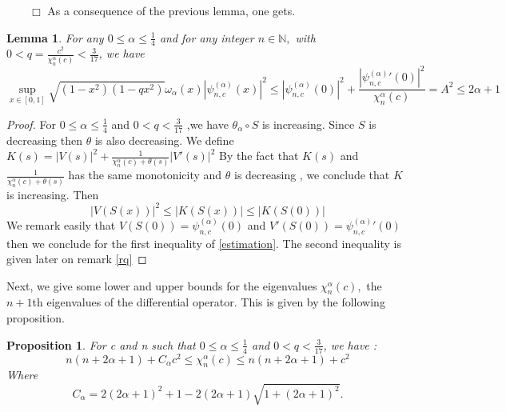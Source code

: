\documentclass[]{article}
\newtheorem{lemma}{Lemma}
\newtheorem{proposition}{Proposition}
\newcommand\ds{\displaystyle}
\newcounter{rea}
\begin{document}
$\qquad \Box $
As a consequence of the previous lemma, one gets.
\begin{lemma}
	For any $0\leq  \alpha\leq \frac{1}{4}$ and for any integer $n\in \mathbb N,$ with  $0<q=\frac{c^2}{\chi_n^\alpha(c)} <\frac{3}{17}$, we have
	\begin{equation}\label{estimation}
	 \ds{\sup_{x\in[0,1]}}\sqrt{(1-x^2)(1-qx^2)}\omega_{\alpha}(x)|\psi_{n,c}^{(\alpha)}(x)|^2\leq|\psi_{n,c}^{(\alpha)}(0)|^2+
	\frac{|{\psi_{n,c}^{(\alpha)}}'(0)|^2}{\chi_n^{\alpha}(c)}= A^2 \leq 2 \alpha + 1 \;
	\end{equation}
	
\end{lemma}


\begin{proof}
	For $0\leq  \alpha\leq \frac{1}{4}$ and $0<q<\frac{3}{17}$ ,we have $ \theta_{\alpha} \circ S $ is increasing. Since $S$ is decreasing then $ \theta $ is also decreasing. We define $K(s)= |V(s)|^2 + \frac{1}{\chi_n^{\alpha}(c)+\theta(s)}|V'(s)|^2 $
	By the fact that $K(s)$ and $ \frac{1}{\chi_n^{\alpha}(c)+\theta(s)} $ has the same monotonicity and  $\theta$ is decreasing , we conclude that $ K $ is increasing.
	Then $$ |V(S(x))|^2 \leq |K(S(x)) | \leq |K(S(0)) | $$
	We remark easily that $ V(S(0)) = \psi_{n,c}^{(\alpha)}(0) $ and $ V'(S(0)) ={ \psi_{n,c}^{(\alpha)}}'(0) $ then we conclude for the first inequality of \eqref{estimation}. The second inequality is given later on remark \ref{rq}
\end{proof}	
Next, we give some lower and upper bounds for the eigenvalues $\chi_n^\alpha(c),$ the $n+1$th eigenvalues of the differential operator. This is given by the following proposition.

\begin{proposition}
	For c and n such that $0\leq  \alpha\leq \frac{1}{4}$ and $0<q<\frac{3}{17}$,
	we have :
	\begin{equation} \label{chi_n}
	n(n+2\alpha+1)+C_\alpha c^2 \leq \chi_n^{\alpha}(c) \leq n(n+2\alpha+1)+c^2
	\end{equation}
	 Where $$ C_{\alpha} = 2(2\alpha+1)^2+1 - 2(2\alpha+1)\sqrt{1+(2\alpha+1)^2}.$$
\end{proposition}
\end{document}
